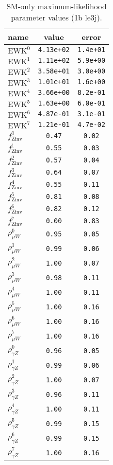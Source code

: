 %

\begin{table}\centering
\caption{SM-only maximum-likelihood parameter values (1b le3j).}
\label{tab:mlParameterValues1b_le3j}
\begin{tabular}{lcc}name & value & error \\ \hline
$\mathrm{EWK}^{0}$ & {\tt  4.13e+02} & {\tt  1.4e+01}\\
$\mathrm{EWK}^{1}$ & {\tt  1.11e+02} & {\tt  5.9e+00}\\
$\mathrm{EWK}^{2}$ & {\tt  3.58e+01} & {\tt  3.0e+00}\\
$\mathrm{EWK}^{3}$ & {\tt  1.01e+01} & {\tt  1.6e+00}\\
$\mathrm{EWK}^{4}$ & {\tt  3.66e+00} & {\tt  8.2e-01}\\
$\mathrm{EWK}^{5}$ & {\tt  1.63e+00} & {\tt  6.0e-01}\\
$\mathrm{EWK}^{6}$ & {\tt  4.87e-01} & {\tt  3.1e-01}\\
$\mathrm{EWK}^{7}$ & {\tt  1.21e-01} & {\tt  4.7e-02}\\
$f_\mathrm{Zinv}^{0}$ & {\tt 0.47} & {\tt 0.02}\\
$f_\mathrm{Zinv}^{1}$ & {\tt 0.55} & {\tt 0.03}\\
$f_\mathrm{Zinv}^{2}$ & {\tt 0.57} & {\tt 0.04}\\
$f_\mathrm{Zinv}^{3}$ & {\tt 0.64} & {\tt 0.07}\\
$f_\mathrm{Zinv}^{4}$ & {\tt 0.55} & {\tt 0.11}\\
$f_\mathrm{Zinv}^{5}$ & {\tt 0.81} & {\tt 0.08}\\
$f_\mathrm{Zinv}^{6}$ & {\tt 0.82} & {\tt 0.12}\\
$f_\mathrm{Zinv}^{7}$ & {\tt 0.00} & {\tt 0.83}\\
$\rho_{\mu W}^{0}$ & {\tt 0.95} & {\tt 0.05}\\
$\rho_{\mu W}^{1}$ & {\tt 0.99} & {\tt 0.06}\\
$\rho_{\mu W}^{2}$ & {\tt 1.00} & {\tt 0.07}\\
$\rho_{\mu W}^{3}$ & {\tt 0.98} & {\tt 0.11}\\
$\rho_{\mu W}^{4}$ & {\tt 1.00} & {\tt 0.11}\\
$\rho_{\mu W}^{5}$ & {\tt 1.00} & {\tt 0.16}\\
$\rho_{\mu W}^{6}$ & {\tt 1.00} & {\tt 0.16}\\
$\rho_{\mu W}^{7}$ & {\tt 1.00} & {\tt 0.16}\\
$\rho_{\gamma Z}^{0}$ & {\tt 0.96} & {\tt 0.05}\\
$\rho_{\gamma Z}^{1}$ & {\tt 0.99} & {\tt 0.06}\\
$\rho_{\gamma Z}^{2}$ & {\tt 1.00} & {\tt 0.07}\\
$\rho_{\gamma Z}^{3}$ & {\tt 0.96} & {\tt 0.11}\\
$\rho_{\gamma Z}^{4}$ & {\tt 1.00} & {\tt 0.11}\\
$\rho_{\gamma Z}^{5}$ & {\tt 0.99} & {\tt 0.15}\\
$\rho_{\gamma Z}^{6}$ & {\tt 0.99} & {\tt 0.15}\\
$\rho_{\gamma Z}^{7}$ & {\tt 1.00} & {\tt 0.16}\\
\hline
\end{tabular}
\end{table}
%